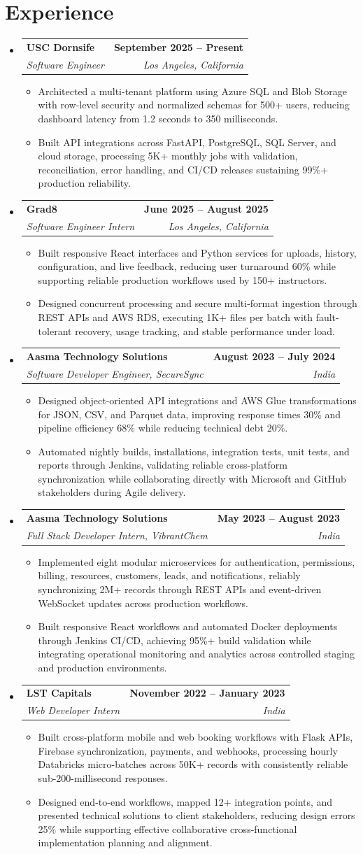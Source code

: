 \documentclass[letterpaper,10pt]{article}
\makeatletter
\newcommand{\itemTail}{\vspace{-4pt}}
\newcommand{\sectionGap}{\vspace{-8pt}}
\newcommand{\roleGap}{\vspace{2pt}}
\newcommand{\resumeItem}[1]{\item\small{{#1 \itemTail}}}
\newcommand{\resumeSubheading}[4]{\vspace{-1pt}\item\begin{tabular*}{1.0\textwidth}[t]{l@{\extracolsep{\fill}}r}\textbf{#1} & \textbf{\small #2} \\\textit{\small#3} & \textit{\small #4} \\\end{tabular*}\vspace{-2pt}}
\newcommand{\resumeSubHeadingListStart}{\begin{itemize}[leftmargin=0.0in, label={}]}
\newcommand{\resumeSubHeadingListEnd}{\end{itemize}}
\newcommand{\resumeItemListStart}{\begin{itemize}[leftmargin=0.15in,label=\textbullet,itemsep=3pt,topsep=0pt,parsep=0pt,partopsep=0pt]}
\newcommand{\resumeItemListEnd}{\end{itemize}\vspace{-4pt}}
\makeatother
\begin{document}
\section{Experience}
\resumeSubHeadingListStart
\resumeSubheading{USC Dornsife}{September 2025 -- Present}{Software Engineer}{Los Angeles, California}
\resumeItemListStart
\resumeItem{Architected a multi-tenant platform using Azure SQL and Blob Storage with row-level security and normalized schemas for 500+ users, reducing dashboard latency from 1.2 seconds to 350 milliseconds.}
\resumeItem{Built API integrations across FastAPI, PostgreSQL, SQL Server, and cloud storage, processing 5K+ monthly jobs with validation, reconciliation, error handling, and CI/CD releases sustaining 99\%+ production reliability.}
\resumeItemListEnd
\roleGap
\resumeSubheading{Grad8}{June 2025 -- August 2025}{Software Engineer Intern}{Los Angeles, California}
\resumeItemListStart
\resumeItem{Built responsive React interfaces and Python services for uploads, history, configuration, and live feedback, reducing user turnaround 60\% while supporting reliable production workflows used by 150+ instructors.}
\resumeItem{Designed concurrent processing and secure multi-format ingestion through REST APIs and AWS RDS, executing 1K+ files per batch with fault-tolerant recovery, usage tracking, and stable performance under load.}
\resumeItemListEnd
\roleGap
\resumeSubheading{Aasma Technology Solutions}{August 2023 -- July 2024}{Software Developer Engineer, SecureSync}{India}
\resumeItemListStart
\resumeItem{Designed object-oriented API integrations and AWS Glue transformations for JSON, CSV, and Parquet data, improving response times 30\% and pipeline efficiency 68\% while reducing technical debt 20\%.}
\resumeItem{Automated nightly builds, installations, integration tests, unit tests, and reports through Jenkins, validating reliable cross-platform synchronization while collaborating directly with Microsoft and GitHub stakeholders during Agile delivery.}
\resumeItemListEnd
\roleGap
\resumeSubheading{Aasma Technology Solutions}{May 2023 -- August 2023}{Full Stack Developer Intern, VibrantChem}{India}
\resumeItemListStart
\resumeItem{Implemented eight modular microservices for authentication, permissions, billing, resources, customers, leads, and notifications, reliably synchronizing 2M+ records through REST APIs and event-driven WebSocket updates across production workflows.}
\resumeItem{Built responsive React workflows and automated Docker deployments through Jenkins CI/CD, achieving 95\%+ build validation while integrating operational monitoring and analytics across controlled staging and production environments.}
\resumeItemListEnd
\roleGap
\resumeSubheading{LST Capitals}{November 2022 -- January 2023}{Web Developer Intern}{India}
\resumeItemListStart
\resumeItem{Built cross-platform mobile and web booking workflows with Flask APIs, Firebase synchronization, payments, and webhooks, processing hourly Databricks micro-batches across 50K+ records with consistently reliable sub-200-millisecond responses.}
\resumeItem{Designed end-to-end workflows, mapped 12+ integration points, and presented technical solutions to client stakeholders, reducing design errors 25\% while supporting effective collaborative cross-functional implementation planning and alignment.}
\resumeItemListEnd
\resumeSubHeadingListEnd
\sectionGap
\end{document}
